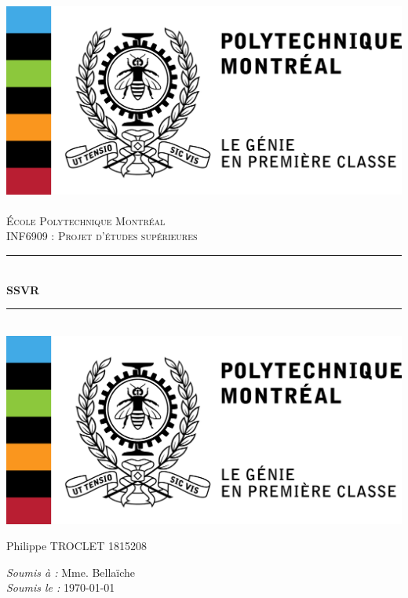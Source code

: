 \documentclass[12pt, openany]{article}%
\newcommand{\HRule}{\rule{\linewidth}{0.5mm}}
\begin{document}
\begin{titlepage}
  \begin{sffamily}
  \begin{center}

    \includegraphics[scale=1]{Images/polytechnique_genie_gauche_fr_rgb.png}~\\[1.5cm]

    \textsc{\LARGE École Polytechnique Montréal}\\[2cm]

    \textsc{\Large INF6909 : Projet d'études supérieures}\\[1.5cm]

    \HRule \\[0.4cm]
    { \huge \bfseries SSVR\\[0.4cm] }

    \HRule \\[2cm]
    \includegraphics[scale=0.5]{Images/polytechnique_genie_gauche_fr_rgb.png}
    \\[2cm]

    \begin{minipage}{0.4\textwidth}
      \begin{flushleft} \large
          Philippe TROCLET \textsc{1815208}\\
      \end{flushleft}
    \end{minipage}
    \begin{minipage}{0.4\textwidth}
      \begin{flushright} \large
        \emph{Soumis à :} Mme. Bellaïche\\
        \emph{Soumis le :} \today
      \end{flushright}
    \end{minipage}


\end{center}
\end{sffamily}
\end{titlepage}
\end{document}
